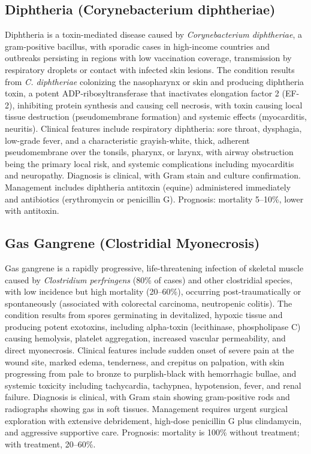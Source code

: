 \subsection{Diphtheria (Corynebacterium diphtheriae)}
\label{sec:Diphtheria}
Diphtheria is a toxin-mediated disease caused by \textit{Corynebacterium diphtheriae}, a gram-positive bacillus, with sporadic cases in high-income countries and outbreaks persisting in regions with low vaccination coverage, transmission by respiratory droplets or contact with infected skin lesions. The condition results from \textit{C. diphtheriae} colonizing the nasopharynx or skin and producing diphtheria toxin, a potent ADP-ribosyltransferase that inactivates elongation factor 2 (EF-2), inhibiting protein synthesis and causing cell necrosis, with toxin causing local tissue destruction (pseudomembrane formation) and systemic effects (myocarditis, neuritis). Clinical features include respiratory diphtheria: sore throat, dysphagia, low-grade fever, and a characteristic grayish-white, thick, adherent pseudomembrane over the tonsils, pharynx, or larynx, with airway obstruction being the primary local risk, and systemic complications including myocarditis and neuropathy. Diagnosis is clinical, with Gram stain and culture confirmation. Management includes diphtheria antitoxin (equine) administered immediately and antibiotics (erythromycin or penicillin G). Prognosis: mortality 5--10\%, lower with antitoxin.

\subsection{Gas Gangrene (Clostridial Myonecrosis)}
\label{sec:Gas Gangrene}
Gas gangrene is a rapidly progressive, life-threatening infection of skeletal muscle caused by \textit{Clostridium perfringens} (80\% of cases) and other clostridial species, with low incidence but high mortality (20--60\%), occurring post-traumatically or spontaneously (associated with colorectal carcinoma, neutropenic colitis). The condition results from spores germinating in devitalized, hypoxic tissue and producing potent exotoxins, including alpha-toxin (lecithinase, phospholipase C) causing hemolysis, platelet aggregation, increased vascular permeability, and direct myonecrosis. Clinical features include sudden onset of severe pain at the wound site, marked edema, tenderness, and crepitus on palpation, with skin progressing from pale to bronze to purplish-black with hemorrhagic bullae, and systemic toxicity including tachycardia, tachypnea, hypotension, fever, and renal failure. Diagnosis is clinical, with Gram stain showing gram-positive rods and radiographs showing gas in soft tissues. Management requires urgent surgical exploration with extensive debridement, high-dose penicillin G plus clindamycin, and aggressive supportive care. Prognosis: mortality is 100\% without treatment; with treatment, 20--60\%.

